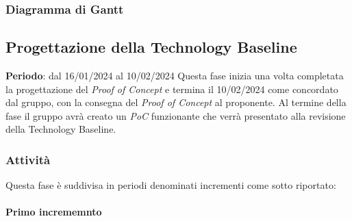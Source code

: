 \newpage 
\subsubsection{Diagramma di Gantt}\label{sec:pianificazione:progRTB:gantt}


\subsection{Progettazione della Technology Baseline}\label{sec:pianificazione:codificaRTB}

\textbf{Periodo}: dal 16/01/2024 al 10/02/2024
Questa fase inizia una volta completata la progettazione del \textit{Proof of Concept} e termina il 10/02/2024 come concordato dal gruppo, con la consegna del \textit{Proof of Concept} al proponente. Al termine della fase il gruppo avrà creato un \textit{PoC} funzionante che verrà presentato alla revisione della Technology Baseline. 

\subsubsection{Attività}\label{sec:pianificazione:codificaRTB:attivita}

Questa fase è suddivisa in periodi denominati incrementi come sotto riportato:

\paragraph{Primo incrememnto}\label{sec:pianificazione:codificaRTB:periodi:primo}

